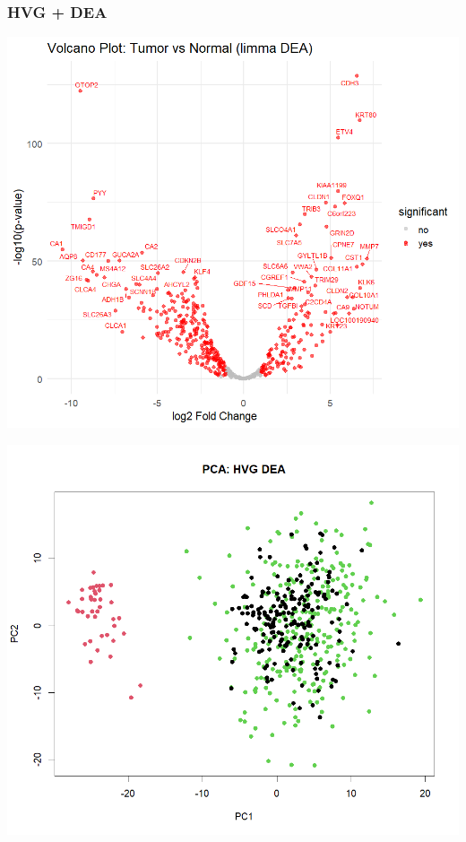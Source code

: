 \documentclass[12pt, aspectratio=43]{beamer}
\begin{document}
	\begin{frame}
		\frametitle{HVG + DEA}
		
		\begin{minipage}[t]{0.50\textwidth} 
			\centering
			\label{fig:gene-a}
			\vspace{0.5em}
			\includegraphics[width=\linewidth]{volcano_hvg.png}
			
		\end{minipage}
		\begin{minipage}[t]{0.50\textwidth} 
			\centering
			
			\label{fig:gene-a}
			\vspace{0.5em}
			\includegraphics[width=\linewidth]{hvg_dea_pca.png}			
		\end{minipage}%
		
	\end{frame}
	
\end{document}
